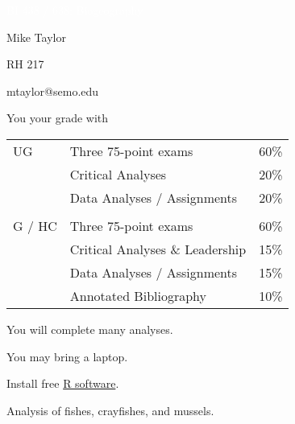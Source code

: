 \documentclass[t]{beamer}
\begin{document}


{
\begin{frame}[b,plain]{\textcolor{white}{BI 438 / 638: Biogeography}}

\end{frame}
}

{
\begin{frame}[t,plain]
\large
\vspace{5ex}
\hangpara\hspace{17em} Mike Taylor

\hangpara\hspace{17em} RH 217

\hangpara\hspace{17em} mtaylor@semo.edu

\end{frame}
}

\begin{frame}[t]{You  your grade with}
	\begin{center}\large\begin{tabular}{@{}lll@{}}
	UG		&	Three 75-point exams 				& 	60\% \\
			&	Critical Analyses					& 	20\% \\
			&	Data Analyses / Assignments			& 	20\% \\
			&										&	\\
	G / HC	&	Three 75-point exams 				& 	60\% \\
			&	Critical Analyses \& Leadership		& 	15\% \\
			&	Data Analyses / Assignments 		&	15\% \\
			&	Annotated Bibliography 				&	10\% \\
		\end{tabular}
	\end{center}
\end{frame}

{
\begin{frame}[t,plain]{You will complete many analyses.}

	\hangpara You may bring a laptop.
	
	\hangpara Install free \href{https://www.r-project.org/}{R software}.
	
	\hangpara Analysis of fishes, crayfishes, and mussels.

\end{frame}
}
\end{document}
